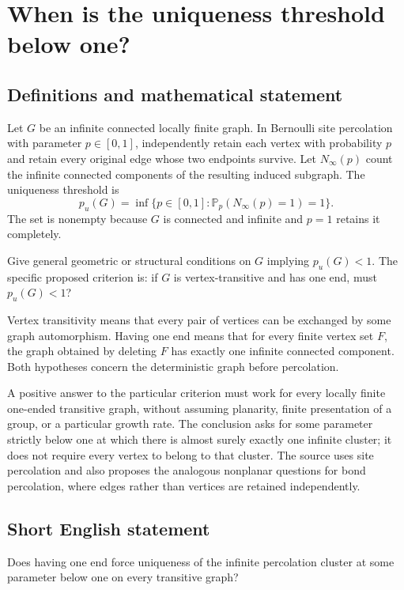 \documentclass[11pt,a4paper]{article}
\begin{document}
\section*{When is the uniqueness threshold below one?}\label{statement}

\subsection{Definitions and mathematical statement}
Let $G$ be an infinite connected locally finite graph. In Bernoulli site percolation with parameter $p\in[0,1]$, independently retain each vertex with probability $p$ and retain every original edge whose two endpoints survive. Let $N_\infty(p)$ count the infinite connected components of the resulting induced subgraph. The uniqueness threshold is
\[
p_u(G)=\inf\{p\in[0,1]:\mathbb P_p(N_\infty(p)=1)=1\}.
\]
The set is nonempty because $G$ is connected and infinite and $p=1$ retains it completely.

Give general geometric or structural conditions on $G$ implying $p_u(G)<1$. The specific proposed criterion is: if $G$ is vertex-transitive and has one end, must $p_u(G)<1$?

Vertex transitivity means that every pair of vertices can be exchanged by some graph automorphism. Having one end means that for every finite vertex set $F$, the graph obtained by deleting $F$ has exactly one infinite connected component. Both hypotheses concern the deterministic graph before percolation.

A positive answer to the particular criterion must work for every locally finite one-ended transitive graph, without assuming planarity, finite presentation of a group, or a particular growth rate. The conclusion asks for some parameter strictly below one at which there is almost surely exactly one infinite cluster; it does not require every vertex to belong to that cluster. The source uses site percolation and also proposes the analogous nonplanar questions for bond percolation, where edges rather than vertices are retained independently.
\subsection{Short English statement}
Does having one end force uniqueness of the infinite percolation cluster at some parameter below one on every transitive graph?
\end{document}
